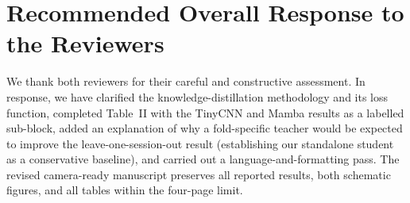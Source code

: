 \documentclass[11pt]{article}
\begin{document}
\section{Recommended Overall Response to the Reviewers}
We thank both reviewers for their careful and constructive assessment. In response, we have clarified the knowledge-distillation methodology and its loss function, completed Table~II with the TinyCNN and Mamba results as a labelled sub-block, added an explanation of why a fold-specific teacher would be expected to improve the leave-one-session-out result (establishing our standalone student as a conservative baseline), and carried out a language-and-formatting pass. The revised camera-ready manuscript preserves all reported results, both schematic figures, and all tables within the four-page limit.
\end{document}
